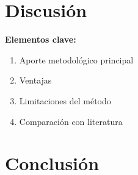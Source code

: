 \documentclass[12pt,a4paper]{article}
\begin{document}
\section*{Discusión}

\textbf{Elementos clave:}

\begin{enumerate}[nosep]
    \item Aporte metodológico principal
    \item Ventajas
    \item Limitaciones del método
    \item Comparación con literatura
\end{enumerate}

\section*{Conclusión}

\end{document}
